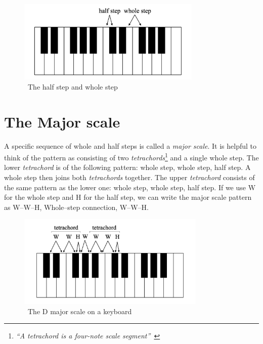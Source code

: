 \begin{figure}
    \centering
    \includegraphics[width=0.78\textwidth]{assets/half-whole-steps}
    \caption{~The half step and whole step~\cite{music-theory}}\label{fig:half-whole-steps}
\end{figure}


\section{The Major scale}\label{sec:major-scale}

A specific sequence of whole and half steps is called a \textit{major scale}.
It is helpful to think of the pattern as consisting of two \textit{tetrachords}\footnote{\textit{``A tetrachord is a four-note scale segment''~\cite{music-theory}}} and a single whole step.
The lower \textit{tetrachord} is of the following pattern: whole step, whole step, half step.
A whole step then joins both \textit{tetrachords} together.
The upper \textit{tetrachord} consists of the same pattern as the lower one: whole step, whole step, half step.
If we use W for the whole step and H for the half step, we can write the major scale pattern as W--W--H, Whole–step connection, W--W--H.~\cite{music-theory}


\begin{figure}
    \centering
    \includegraphics[width=0.8\textwidth]{assets/major-scale-keyboard}
    \caption{~The D major scale on a keyboard~\cite{music-theory}}\label{fig:major-scale-keyboard}
\end{figure}


